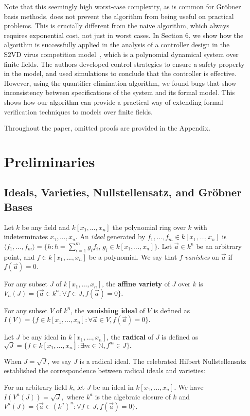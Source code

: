 \documentclass[envcountsect]{llncs}
\begin{document}
Note that this seemingly high worst-case complexity, as is common for Gr\"obner basis methods, does not prevent the algorithm from being useful on practical problems. This is crucially different from the naive algorithm, which always requires exponential cost, not just in worst cases. In Section 6, we show how the algorithm is successfully applied in the analysis of a controller design in the S2VD virus competition model~\cite{virus}, which is a polynomial dynamical system over finite fields. The authors developed control strategies to ensure a safety property in the model, and used simulations to conclude that the controller is effective. However, using the quantifier elimination algorithm, we found bugs that show inconsistency between specifications of the system and its formal model. This shows how our algorithm can provide a practical way of extending formal verification techniques to models over finite fields.

Throughout the paper, omitted proofs are provided in the Appendix.

\section{Preliminaries}
\subsection{Ideals, Varieties, Nullstellensatz, and Gr\"obner Bases}

Let $k$ be any field and $k[x_1,...,x_n]$ the polynomial ring over $k$ with indeterminates $x_1,...,x_n$. An {\em ideal} generated by $f_1,...,f_m\in k[x_1,...,x_n]$ is $\langle f_1,...,f_m\rangle=\{h:h=\sum_{i=1}^m g_if_i$, $g_i\in k[x_1,...,x_n]\}.$ Let $\vec a \in k^n$ be an arbitrary point, and $f\in k[x_1,...,x_n]$ be a polynomial. We say that $f$ {\em vanishes} on $\vec a$ if $f(\vec a) = 0$. 
\begin{definition}
For any subset $J$ of $k[x_1,...,x_n]$, the {\bf affine variety} of $J$ over $k$ is {$V_n(J)=\{\vec  a\in k^n:\forall f\in J, f(\vec  a)=0\}.$}
\end{definition}
\begin{definition}
For any subset $V$ of $k^n$, the {\bf vanishing ideal}
of $V$ is defined as $I(V)=\{f\in k[x_1,...,x_n]: \forall \vec  a\in V, f(\vec 
a)=0\}.$
\end{definition}
\begin{definition}
Let $J$ be any ideal in $k[x_1,...,x_n]$, the {\bf radical} of $J$ is defined as $\sqrt J=\{f\in k[x_1,...,x_n]:\exists m\in \mathbb{N}, f^m\in J\}.$
\end{definition}
 When $J=\sqrt J$, we say $J$ is a radical ideal. The celebrated Hilbert Nullstellensatz established the correspondence between radical ideals and varieties:
\begin{theorem}\label{sN}
For an arbitrary field $k$, let $J$ be an ideal in $k[x_1,...,x_n]$. We have $I(V^a(J))=\sqrt J,$ where $k^a$ is the algebraic closure of $k$ and $V^a(J)=\{\vec  a \in (k^a)^n: \forall f\in J, f(\vec  a)=0\}.$
\end{theorem}
\end{document}
